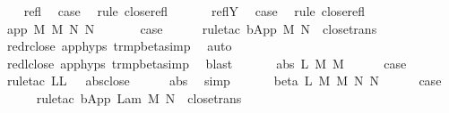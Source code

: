 \begin{isabellebody}
\ \ \isamarkupfalse%
\ refl\ \isamarkupfalse%
\ {\isacharquery}case\ \isamarkupfalse%
\ {\isacharparenleft}rule\ close{\isachardot}refl{\isacharparenright}\isanewline
\ \ \isamarkupfalse%
\isanewline
\ \ \isamarkupfalse%
\ reflY\ \isamarkupfalse%
\ {\isacharquery}case\ \isamarkupfalse%
\ {\isacharparenleft}rule\ close{\isachardot}refl{\isacharparenright}\isanewline
\ \ \isamarkupfalse%
\ {\isacharparenleft}app\ M\ M{\isacharprime}\ N\ N{\isacharprime}{\isacharparenright}\ \isanewline
\ \ \ \ \isamarkupfalse%
\ {\isacharquery}case\isanewline
\ \ \ \ \isamarkupfalse%
\ {\isacharparenleft}rule{\isacharunderscore}tac\ b{\isacharequal}{\isachardoublequoteopen}App\ M\ N{\isacharprime}{\isachardoublequoteclose}\ \ close{\isachardot}trans{\isacharparenright}\isanewline
\ \ \ \ \isamarkupfalse%
\ red{\isacharunderscore}r{\isacharunderscore}close\ app{\isachardot}hyps{\isacharparenleft}{}{\isacharcomma}{}{\isacharparenright}\ trm{\isacharunderscore}pbeta{\isacharunderscore}simp{}\ \isamarkupfalse%
\ auto{\isacharbrackleft}{}{\isacharbrackright}\isanewline
\ \ \ \ \isamarkupfalse%
\ red{\isacharunderscore}l{\isacharunderscore}close\ app{\isachardot}hyps{\isacharparenleft}{}{\isacharcomma}{}{\isacharparenright}\ trm{\isacharunderscore}pbeta{\isacharunderscore}simp{}\ \isamarkupfalse%
\ blast\isanewline
\ \ \isamarkupfalse%
\isanewline
\ \ \isamarkupfalse%
\ {\isacharparenleft}abs\ L\ M\ M{\isacharprime}{\isacharparenright}\isanewline
\ \ \ \ \isamarkupfalse%
\ {\isacharquery}case\isanewline
\ \ \ \ \isamarkupfalse%
\ {\isacharparenleft}rule{\isacharunderscore}tac\ L{\isacharequal}L\ \ \ abs{\isacharunderscore}close{\isacharparenright}\isanewline
\ \ \ \ \isamarkupfalse%
\ abs\ \isamarkupfalse%
\ simp{\isacharplus}\isanewline
\ \ \isamarkupfalse%
\isanewline
\ \ \isamarkupfalse%
\ {\isacharparenleft}beta\ L\ M\ M{\isacharprime}\ N\ N{\isacharprime}{\isacharparenright}\isanewline
\ \ \ \ \isamarkupfalse%
\ {\isacharquery}case\isanewline
\ \ \ \ \isamarkupfalse%
\ {\isacharparenleft}rule{\isacharunderscore}tac\ b{\isacharequal}{\isachardoublequoteopen}App\ {\isacharparenleft}Lam\ M{\isacharprime}{\isacharparenright}\ N{\isachardoublequoteclose}\ \ close{\isachardot}trans{\isacharparenright}\isanewline

\end{isabellebody}
